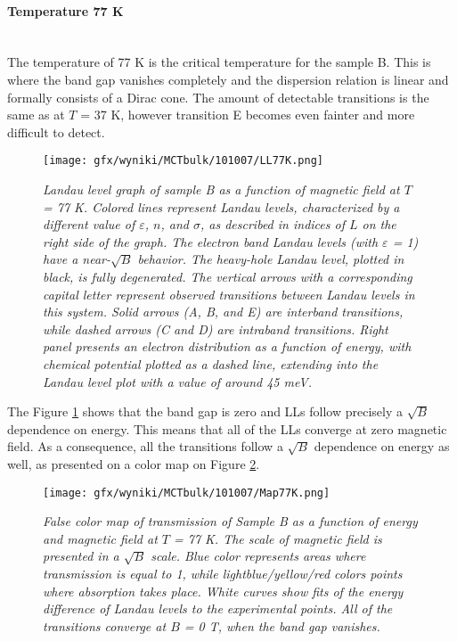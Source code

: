 \documentclass[titlepage,a4paper]{book}
\newcommand{\wciecie}{\quad\phantom{v}}
\newcommand{\myparagraph}[1]{\paragraph{#1}\mbox{}\\}
\begin{document}
\clearpage
\myparagraph{Temperature 77 K}
\wciecie
The temperature of 77 K is the critical temperature for the sample B. This is where the band gap vanishes completely and the dispersion relation is linear and formally consists of a Dirac cone. The amount of detectable transitions is the same as at $T$ = 37 K, however transition E becomes even fainter and more difficult to detect. 
\begin{figure}[ht]
	\centering
	\texttt{[image: gfx/wyniki/MCTbulk/101007/LL77K.png]}
	\vspace{-10pt}
	\caption{\textit{Landau level graph of sample B as a function of magnetic field at $T$ = 77 K. Colored lines represent Landau levels, characterized by a different value of $\varepsilon$, $n$, and $\sigma$, as described in indices of $L$ on the right side of the graph. The electron band Landau levels (with $\varepsilon$ = 1) have a near-$\sqrt{B}$ behavior. The heavy-hole Landau level, plotted in black, is fully degenerated. The vertical arrows with a corresponding capital letter represent observed transitions between Landau levels in this system. Solid arrows (A, B, and E) are interband transitions, while dashed arrows (C and D) are intraband transitions. Right panel presents an electron distribution as a function of energy, with chemical potential plotted as a dashed line, extending into the Landau level plot with a value of around 45 meV.}}
	\label{fig:LL_101007_77K}
\end{figure}

The Figure \ref{fig:LL_101007_77K} shows that the band gap is zero and LLs follow precisely a $\sqrt{B}$ dependence on energy. This means that all of the LLs converge at zero magnetic field. As a consequence, all the transitions follow a $\sqrt{B}$ dependence on energy as well, as presented on a color map on Figure \ref{fig:Map_101007_77K}. 

\begin{figure}[ht]
	\centering
	\texttt{[image: gfx/wyniki/MCTbulk/101007/Map77K.png]}
	\vspace{-10pt}
	\caption{\textit{False color map of transmission of Sample B as a function of energy and magnetic field at $T$ = 77 K. The scale of magnetic field is presented in a $\sqrt{B}$ scale. Blue color represents areas where transmission is equal to 1, while lightblue/yellow/red colors points where absorption takes place. White curves show fits of the energy difference of Landau levels to the experimental points. All of the transitions converge at $B$ = 0 T, when the band gap vanishes.}}
	\label{fig:Map_101007_77K}
\end{figure} 
\end{document}
